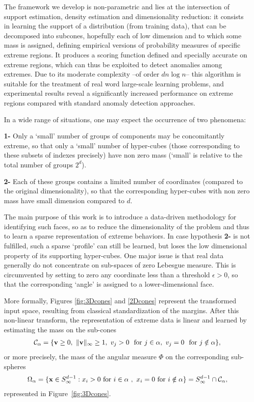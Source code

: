 The framework we develop is non-parametric and lies at the intersection of support estimation, density estimation and dimensionality reduction: it consists in learning the support of a distribution (from training data), that can be decomposed into subcones, hopefully each of low dimension and to which some mass is assigned, defining empirical versions of probability measures of specific extreme regions. 
It produces a scoring function defined and specially accurate on extreme regions, which can thus be exploited to detect anomalies among extremes.
Due to its moderate complexity --of order $d n \log n$-- this algorithm is suitable for the treatment of real word large-scale learning problems, and experimental results reveal a significantly increased performance on extreme regions compared with standard anomaly detection approaches. 



In a wide range of situations, one may expect the occurrence of two phenomena:

\textbf{1-} Only a `small' number of groups of components may be concomitantly extreme, so that only a `small' number of hyper-cubes (those corresponding to these subsets of indexes precisely) have non zero mass (`small' is relative to the total number of groups $2^d$).

\textbf{2-} Each of these groups contains a limited number of coordinates (compared to the original dimensionality), so that the corresponding hyper-cubes with non zero mass have small dimension compared to $d$.

The main purpose of this work is to introduce a data-driven methodology for identifying such faces, so as to reduce the
dimensionality of the problem and thus to learn a sparse representation  of extreme behaviors. 
In case hypothesis \textbf{2-} is not fulfilled, such a sparse  `profile' can still be learned, but loses the low dimensional property of its supporting hyper-cubes.
One major issue is that real data generally do not concentrate on sub-spaces of zero Lebesgue measure. This is circumvented by setting to zero any coordinate less than a threshold $\epsilon>0$, so that the corresponding `angle' is assigned to a lower-dimensional face. 

More formally, Figures \ref{fig:3Dcones} and \ref{2Dcones} represent the transformed input space, resulting from classical standardization of the margins. After this non-linear transform, the representation of extreme data is linear and learned by estimating the mass on the sub-cones
\begin{align*}
 \mathcal{C}_\alpha = \{\mathbf v \ge 0,~\|\mathbf v\|_\infty \ge 1,~ v_j > 0 ~\text{ for } j \in \alpha,~ v_j = 0 ~\text{ for } j \notin \alpha \},
\end{align*}
or more precisely, the mass of the angular measure $\Phi$ on the corresponding sub-spheres
\begin{align*}
\Omega_{\alpha}  = \{\mathbf x \in S_{\infty}^{d-1} :  x_i > 0 \text{ for } i\in\alpha~,~  x_i = 0 \text{ for } i\notin \alpha   \} 
 = S_{\infty}^{d-1}\cap {\mathcal{C}}_\alpha,
\end{align*}
represented in Figure~\ref{fig:3Dcones}.

